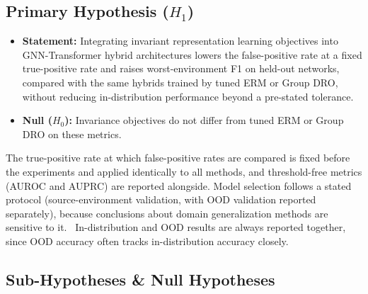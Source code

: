 \documentclass[a4paper,10pt]{article}
\begin{document}
\subsection{Primary Hypothesis (\texorpdfstring{$H_1$}{H1})}

\begin{itemize}
    \item \textbf{Statement:} Integrating invariant representation learning objectives into GNN-Transformer hybrid architectures lowers the false-positive rate at a fixed true-positive rate and raises worst-environment F1 on held-out networks, compared with the same hybrids trained by tuned ERM or Group DRO, without reducing in-distribution performance beyond a pre-stated tolerance.
    \item \textbf{Null ($H_{0}$):} Invariance objectives do not differ from tuned ERM or Group DRO on these metrics.
\end{itemize}

The true-positive rate at which false-positive rates are compared is fixed before the experiments and applied identically to all methods, and threshold-free metrics (AUROC and AUPRC) are reported alongside. Model selection follows a stated protocol (source-environment validation, with OOD validation reported separately), because conclusions about domain generalization methods are sensitive to it.~\cite{gulrajani2021lost} In-distribution and OOD results are always reported together, since OOD accuracy often tracks in-distribution accuracy closely.~\cite{miller2021line}

\subsection{Sub-Hypotheses \texorpdfstring{\&}{and} Null Hypotheses}
\end{document}

